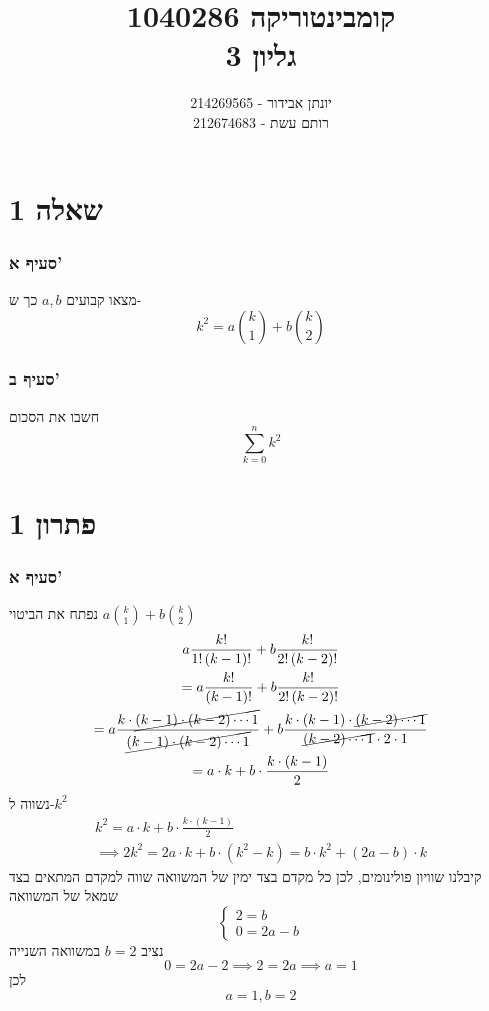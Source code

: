 \documentclass[12pt, titlepage]{article}
\title{קומבינטוריקה 1040286 \\ גליון 3}
\author{יונתן אבידור - 214269565\\רותם עשת - 212674683}
\begin{document}
\maketitle
\pagestyle{fancy}
\fancyhead{}
\part*{שאלה 1}
\section*{סעיף א'}
מצאו קבועים $a,b$ כך ש-
\[
    k^2 = a\binom{k}{1} + b\binom{k}{2}
\]
\section*{סעיף ב'}
חשבו את הסכום
\[
    \sum_{k=0}^{n}k^2
\]
\newpage
\part*{פתרון 1}
\section*{סעיף א'}
נפתח את הביטוי $a\binom{k}{1} + b\binom{k}{2}$
\begin{gather*}
 a\frac{k!}{1! \left(k-1\right)!} + b\frac{k!}{2!\left(k-2\right)!}\\
    = a \frac{k!}{\left(k-1\right)!} + b\frac{k!}{2!\left(k-2\right)!}\\
    = a \frac{k\cdot\cancel{\left(k-1\right)\cdot\left(k-2\right)\cdots 1}}{\cancel{\left(k-1\right)\cdot\left(k-2\right)\cdots 1}} + b\frac{k\cdot\left(k-1\right)\cdot\cancel{\left(k-2\right)\cdots 1}}{\cancel{\left(k-2\right)\cdots 1} \cdot 2 \cdot 1} \\
    = a \cdot k + b \cdot \frac{k\cdot\left(k-1\right)}{2}
\end{gather*}
נשווה ל-$k^2$
\begin{gather*}
    k^2= a \cdot k + b \cdot \frac{k\cdot\left(k-1\right)}{2}\\
    \implies 2k^2 = 2a \cdot k + b\cdot\left(k^2-k\right) = b\cdot k^2 + \left(2a-b\right) \cdot k
\end{gather*}
קיבלנו שוויון פולינומים, לכן כל מקדם בצד ימין של המשוואה שווה למקדם המתאים בצד שמאל של המשוואה
\[
\begin{cases}
    2 = b \\
    0 = 2a-b
\end{cases}
\]
נציב $b=2$ במשוואה השנייה
\[
0 = 2a -2 \implies 2 = 2a \implies a =1
\]
לכן
\[
    \boxed{a=1,b=2}
\]
\end{document}
